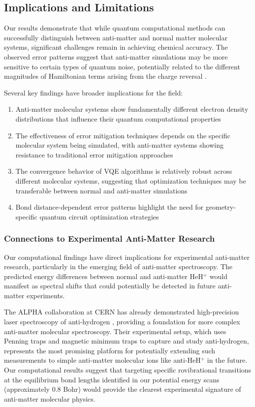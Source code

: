 \documentclass[10pt,twocolumn,a4paper]{article}
\begin{document}
\subsection{Implications and Limitations}
Our results demonstrate that while quantum computational methods can successfully distinguish between anti-matter and normal matter molecular systems, significant challenges remain in achieving chemical accuracy. The observed error patterns suggest that anti-matter simulations may be more sensitive to certain types of quantum noise, potentially related to the different magnitudes of Hamiltonian terms arising from the charge reversal \cite{cerezo2021variational}.

Several key findings have broader implications for the field:

\begin{enumerate}
    \item Anti-matter molecular systems show fundamentally different electron density distributions that influence their quantum computational properties
    
    \item The effectiveness of error mitigation techniques depends on the specific molecular system being simulated, with anti-matter systems showing resistance to traditional error mitigation approaches
    
    \item The convergence behavior of VQE algorithms is relatively robust across different molecular systems, suggesting that optimization techniques may be transferable between normal and anti-matter simulations
    
    \item Bond distance-dependent error patterns highlight the need for geometry-specific quantum circuit optimization strategies
\end{enumerate}

\subsubsection{Connections to Experimental Anti-Matter Research}
Our computational findings have direct implications for experimental anti-matter research, particularly in the emerging field of anti-matter spectroscopy. The predicted energy differences between normal and anti-matter HeH$^+$ would manifest as spectral shifts that could potentially be detected in future anti-matter experiments.

The ALPHA collaboration at CERN has already demonstrated high-precision laser spectroscopy of anti-hydrogen \cite{alpha2022spectroscopy}, providing a foundation for more complex anti-matter molecular spectroscopy. Their experimental setup, which uses Penning traps and magnetic minimum traps to capture and study anti-hydrogen, represents the most promising platform for potentially extending such measurements to simple anti-matter molecular ions like anti-HeH$^+$ in the future. Our computational results suggest that targeting specific rovibrational transitions at the equilibrium bond lengths identified in our potential energy scans (approximately 0.8 Bohr) would provide the clearest experimental signature of anti-matter molecular physics.
\end{document}
